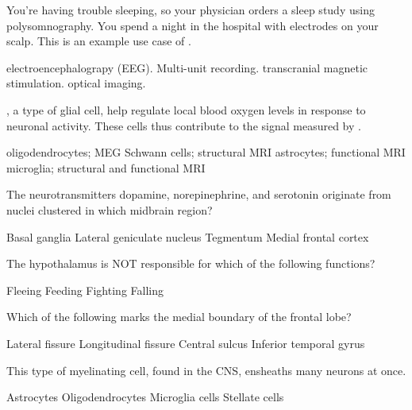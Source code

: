 \documentclass[answers]{exam}
\begin{document}
\begin{questions}
\newpage

\question You're having trouble sleeping, so your physician orders a sleep study using polysomnography. You spend a night in the hospital with electrodes on your scalp. This is an example use case of \fillin.
\begin{choices}
\correctchoice electroencephalograpy (EEG).
\choice Multi-unit recording.
\choice transcranial magnetic stimulation.
\choice optical imaging.
\end{choices}

\question \fillin, a type of glial cell, help regulate local blood oxygen levels in response to neuronal activity. These cells thus contribute to the signal measured by \fillin.
\begin{choices}
\choice oligodendrocytes; MEG
\choice Schwann cells; structural MRI
\correctchoice astrocytes; functional MRI
\choice microglia; structural and functional MRI
\end{choices}

\question The neurotransmitters dopamine, norepinephrine, and serotonin originate from nuclei clustered in which midbrain region?
\begin{choices}
\choice Basal ganglia
\choice Lateral geniculate nucleus
\correctchoice Tegmentum
\choice Medial frontal cortex
\end{choices}

\question The hypothalamus is NOT responsible for which of the following functions?
\begin{choices}
\choice Fleeing
\choice Feeding
\choice Fighting
\correctchoice Falling
\end{choices}

\question Which of the following marks the medial boundary of the frontal lobe?
\begin{choices}
\choice Lateral fissure
\correctchoice Longitudinal fissure
\choice Central sulcus
\choice Inferior temporal gyrus
\end{choices}

\question This type of myelinating cell, found in the CNS, ensheaths many neurons at once.
\begin{choices}
\choice Astrocytes
\correctchoice Oligodendrocytes
\choice Microglia cells
\choice Stellate cells
\end{choices}



\end{questions}
\end{document}
